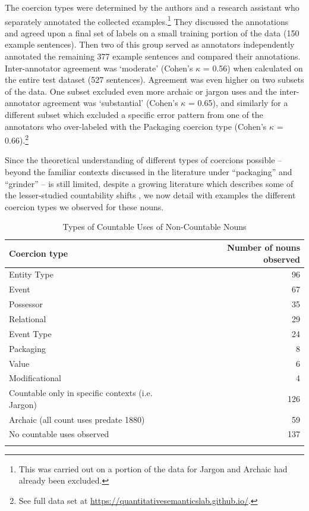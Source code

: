 \documentclass[output=paper]{langscibook}
\begin{document}
The coercion types were determined by the authors and a research assistant who separately annotated the collected examples.\footnote{This was carried out on a portion of the data for Jargon and Archaic had already been excluded.} They discussed the annotations and agreed upon a final set of labels on a small training portion of the data (150 example sentences). Then two of this group served as annotators independently annotated the remaining 377 example sentences and compared their annotations.  Inter-annotator agreement was `moderate' (Cohen's $\kappa$ = 0.56) when calculated on the entire test dataset (527 sentences). Agreement was even higher on two subsets of the data.   One subset excluded even more archaic or jargon uses and the inter-annotator agreement was `substantial' (Cohen's $\kappa$ = 0.65), and similarly for a different subset which excluded a specific error pattern from one of the annotators who over-labeled with the Packaging coercion type (Cohen's $\kappa$ = 0.66).\footnote{See full data set at \url{https://quantitativesemanticslab.github.io/}.}




Since the theoretical understanding of different types of coercions possible -- beyond the familiar contexts discussed in the literature under ``packaging'' and ``grinder''  -- is still limited, despite a growing literature which describes some of the lesser-studied countability shifts \citep{Huddleston2002,grimm2014individuating,Husic2020,ZamparelliToAppear},   we now detail with examples the different coercion types we observed for these nouns.



\begin{table}[]
    \centering
    \begin{tabular}{lr}
    \lsptoprule
        Coercion type    &  Number of nouns observed \\ 
  \midrule
 Entity Type  & 96 \\
 Event  & 67 \\ 
 Possessor  & 35 \\
 Relational & 29 \\
 Event Type  & 24 \\
 Packaging  & 8 \\
 Value & 6 \\
 Modificational & 4 \\
 Countable only in specific contexts (i.e. Jargon) & 126 \\
 Archaic (all count uses predate 1880) & 59 \\
  No countable uses observed & 137 \\
  \lspbottomrule
\end{tabular}
    \caption{Types of Countable Uses of Non-Countable Nouns}
    \label{gri-ric:tab:coercion}
\end{table}
\end{document}
